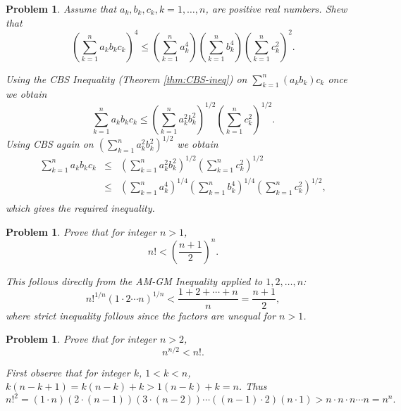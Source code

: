 \documentclass[11pt, openany]{book}
\theoremstyle{change} \theoremheaderfont{\blue\sffamily\bfseries}
\newtheorem{pro}[thm]{Problem}
\theoremstyle{nonumberplain} \theoremheaderfont{\sffamily\bfseries}
\newcommand{\í}{\'{\i}}
\begin{document}
\begin{multicols}{2}
\begin{pro}
Assume that $a_k, b_k, c_k, k = 1, \ldots, n$, are positive real
numbers. Shew that
$$\left(\sum _{k = 1} ^n a_kb_kc_k\right)^{4}
\leq \left(\sum _{k = 1} ^n a_k ^4\right)\left(\sum _{k = 1} ^n b_k
^4\right) \left(\sum _{k = 1} ^n c_k
^2\right)^{2}.$$\begin{answer}Using the CBS Inequality (Theorem
\ref{thm:CBS-ineq}) on $\sum _{k = 1} ^n (a_kb_k)c_k$ once we obtain
$$\sum _{k = 1} ^n a_kb_kc_k
\leq \left(\sum _{k = 1} ^n a_k ^2b_k ^2\right)^{1/2} \left(\sum _{k
= 1} ^n c_k ^2\right)^{1/2}.
$$Using CBS again on $\left(\sum _{k = 1} ^n a_k ^2b_k ^2\right)^{1/2}$ we obtain
$$
\begin{array}{lll}
\sum _{k = 1} ^n a_kb_kc_k  & \leq &
 \left(\sum _{k = 1} ^n a_k ^2 b_k ^2\right)^{1/2}
\left(\sum _{k = 1} ^n c_k ^2\right)^{1/2} \\
  & \leq & \left(\sum _{k = 1} ^n a_k ^4\right)^{1/4}
\left(\sum _{k = 1} ^n b_k ^4\right)^{1/4}
\left(\sum _{k = 1} ^n c_k ^2\right)^{1/2}, \\
\end{array}
$$which gives the required inequality.
\end{answer}
\end{pro}
\begin{pro}
Prove that for integer $n>1$, $$ n!<\left(\dfrac{n+1}{2}\right)^n.
$$
\begin{answer}
This follows directly from the AM-GM Inequality applied to
$1,2,\ldots , n$:
$$ n!^{1/n} (1\cdot 2 \cdots n)^{1/n}< \dfrac{1+2+\cdots + n}{n} = \dfrac{n+1}{2},
$$where strict inequality follows since the factors are unequal for
$n>1$.
\end{answer}
\end{pro}
\begin{pro}
Prove that for integer $n>2$, $$ n^{n/2}<n!.
$$
\begin{answer}
First observe that for integer $k$, $1< k < n$,\quad
$k(n-k+1)=k(n-k)+k>1(n-k)+k= n$. Thus
$$ n!^2 = (1\cdot n)(2\cdot (n-1))(3\cdot (n-2))\cdots ((n-1)\cdot 2)(n\cdot 1)>n\cdot n\cdot n\cdots n=n^n.  $$
\end{answer}
\end{pro}


\end{multicols}
\end{document}
